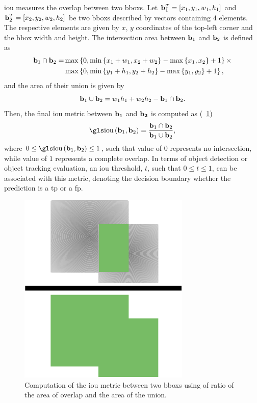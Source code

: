 \Gls{iou} measures the overlap between two \glspl{bbox}. Let ${\mathbf{b}}_{1}^{T} = \left[ {x_1, y_1, w_1, h_1} \right]$ and ${\mathbf{b}}_{2}^{T} = \left[ {x_2, y_2, w_2, h_2} \right]$ be two \glspl{bbox} described by vectors containing $4$ elements. The respective elements are given by $x$, $y$ coordinates of the top-left corner and the \gls{bbox} width and height. The intersection area between $\mathbf{b}_1$ and $\mathbf{b}_2$ is defined as
\begin{equation}
    \begin{aligned}
        \mathbf{b}_1 \cap \mathbf{b}_2 =
         & \max \left\{ {0,
            \min \left\{ {x_1 + w_1, x_2 + w_2} \right\} - \max \left\{ {x_1, x_2} \right\} + 1} \right\}
        \times                \\
         & \max \left\{ {0,
            \min \left\{ {y_1 + h_1, y_2 + h_2} \right\} - \max \left\{ {y_1, y_2} \right\} + 1} \right\},
    \end{aligned}
\end{equation}
and the area of their union is given by
\begin{equation}
    \mathbf{b}_1 \cup \mathbf{b}_2 = w_1 h_1 + w_2 h_2 - \mathbf{b}_1 \cap \mathbf{b}_2.
\end{equation}
Then, the final \gls{iou} metric between $\mathbf{b_1}$ and $\mathbf{b_2}$ is computed as (\figtext{}~\ref{fig:IntersectionOverUnion})
\begin{equation}
    \label{eq:IntersectionOverUnion}
    \func{\IOU}{\vect{b}_1, \vect{b}_2} =
    \frac{\vect{b}_1 \cap \vect{b}_2}{\vect{b}_1 \cup \vect{b}_2},
\end{equation}
where $0 \leq \func{\IOU}{\vect{b}_1, \vect{b}_2} \leq 1$, such that value of $0$ represents no intersection, while value of $1$ represents a complete overlap. In terms of object detection or object tracking evaluation, an \gls{iou} threshold, $t$, such that $0 \leq t \leq 1$, can be associated with this metric, denoting the decision boundary whether the prediction is a \gls{tp} or a \gls{fp}.

\begin{figure}[t]
    \centerline{\includegraphics[width=0.2\linewidth]{figures/theoretical_foundations/intersection_over_union.pdf}}
    \caption[\Gls{iou} visualization]{Computation of the \gls{iou} metric between two \glspl{bbox} using of ratio of the area of overlap and the area of the union.}
    \label{fig:IntersectionOverUnion}
\end{figure}

